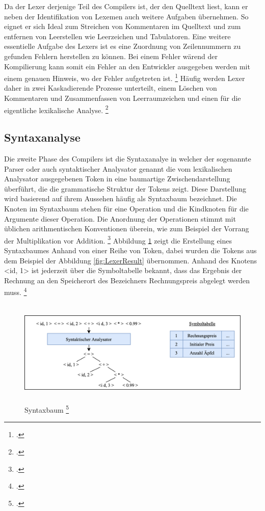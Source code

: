 Da der Lexer derjenige Teil des Compilers ist, der den Quelltext liest, kann er neben der Identifikation von Lexemen auch weitere Aufgaben übernehmen. So eignet er sich Ideal zum Streichen von Kommentaren im Quelltext und zum entfernen von Leerstellen wie Leerzeichen und Tabulatoren.  Eine weitere essentielle Aufgabe des Lexers ist es eine Zuordnung von Zeilennummern zu gefunden Fehlern herstellen zu können.  Bei einem Fehler wärend der Kompilierung kann somit ein Fehler an den Entwickler ausgegeben werden mit einem genauen Hinweis,  wo der Fehler aufgetreten ist.  \footcite[Vgl.][S. 135.]{Ullmann2008} 
Häufig werden Lexer daher in zwei Kaskadierende Prozesse unterteilt, einem Löschen von Kommentaren und Zusammenfassen von Leerraumzeichen und einen für die eigentliche lexikalische Analyse.  \footcite[Vgl.][S. 136.]{Ullmann2008} 

\subsection{Syntaxanalyse}
Die zweite Phase des Compilers ist die Syntaxanalye in welcher der sogenannte Parser oder auch syntaktischer Analysator genannt die vom lexikalischen Analysator ausgegebenen Token in eine baumartige Zwischendarstellung überführt, die die grammatische Struktur der Tokens zeigt.  Diese Darstellung wird basierend auf ihrem Aussehen häufig als Syntaxbaum bezeichnet.  Die Knoten im Syntaxbaum stehen für eine Operation und die Kindknoten für die Argumente dieser Operation.  Die Anordnung der Operationen stimmt mit üblichen arithmentischen Konventionen überein,  wie zum Beispiel der Vorrang der Multiplikation vor Addition. \footcite[Vgl.][S. 9]{Ullmann2008} Abbildung \ref{fig:ParserResult} zeigt die Erstellung eines Syntaxbaumes Anhand von einer Reihe von Token, dabei wurden die Tokens aus dem Beispiel der Abbildung  \ref{fig:LexerResult} übernommen.  Anhand des Knotens <id, 1> ist jederzeit über die Symboltabelle bekannt,  dass das Ergebnis der Rechnung an den Speicherort des Bezeichners Rechnungspreis abgelegt werden muss. \footcite[Vgl.][S. 9.]{Ullmann2008} 

\begin{figure}[!ht]
 \includegraphics[width=14.5cm,height=5cm]{Images/Compiler/ParserResult.png}
 \caption[Syntaxbaum]{Syntaxbaum \protect\footcite{Ullmann2008} }
 \label{fig:ParserResult}
\end{figure}
